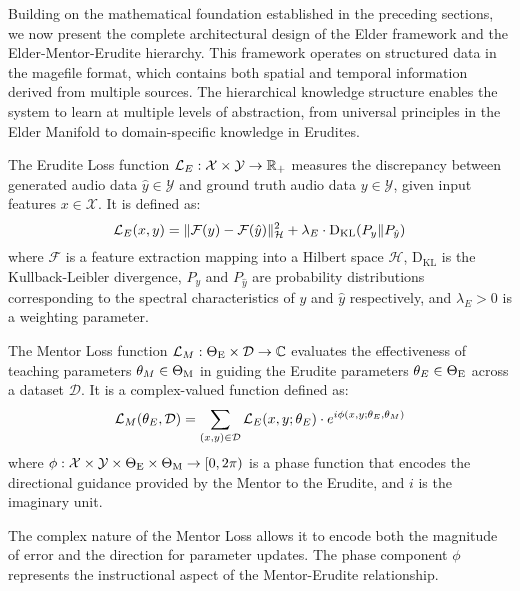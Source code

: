 Building on the mathematical foundation established in the preceding sections, we now present the complete architectural design of the Elder framework and the Elder-Mentor-Erudite hierarchy. This framework operates on structured data in the magefile format, which contains both spatial and temporal information derived from multiple sources. The hierarchical knowledge structure enables the system to learn at multiple levels of abstraction, from universal principles in the Elder Manifold to domain-specific knowledge in Erudites.

\begin{definition}
The Erudite Loss function $\mathcal{L}_E: \mathcal{X} \times \mathcal{Y} \rightarrow \mathbb{R}_+$ measures the discrepancy between generated audio data $\hat{y} \in \mathcal{Y}$ and ground truth audio data $y \in \mathcal{Y}$, given input features $x \in \mathcal{X}$. It is defined as:
\begin{equation}
\mathcal{L}_E(x, y) = \| \mathcal{F}(y) - \mathcal{F}(\hat{y}) \|_{\mathcal{H}}^2 + \lambda_E \cdot \mathrm{D_{KL}}(P_y \| P_{\hat{y}})
\end{equation}
where $\mathcal{F}$ is a feature extraction mapping into a Hilbert space $\mathcal{H}$, $\mathrm{D_{KL}}$ is the Kullback-Leibler divergence, $P_y$ and $P_{\hat{y}}$ are probability distributions corresponding to the spectral characteristics of $y$ and $\hat{y}$ respectively, and $\lambda_E > 0$ is a weighting parameter.
\end{definition}

\begin{definition}
The Mentor Loss function $\mathcal{L}_M: \Theta_{\text{E}} \times \mathcal{D} \rightarrow \mathbb{C}$ evaluates the effectiveness of teaching parameters $\theta_M \in \Theta_{\text{M}}$ in guiding the Erudite parameters $\theta_E \in \Theta_{\text{E}}$ across a dataset $\mathcal{D}$. It is a complex-valued function defined as:
\begin{equation}
\mathcal{L}_M(\theta_E, \mathcal{D}) = \sum_{(x,y) \in \mathcal{D}} \mathcal{L}_E(x, y; \theta_E) \cdot e^{i\phi(x,y;\theta_E,\theta_M)}
\end{equation}
where $\phi: \mathcal{X} \times \mathcal{Y} \times \Theta_{\text{E}} \times \Theta_{\text{M}} \rightarrow [0, 2\pi)$ is a phase function that encodes the directional guidance provided by the Mentor to the Erudite, and $i$ is the imaginary unit.
\end{definition}

\begin{remark}
The complex nature of the Mentor Loss allows it to encode both the magnitude of error and the direction for parameter updates. The phase component $\phi$ represents the instructional aspect of the Mentor-Erudite relationship.
\end{remark}

